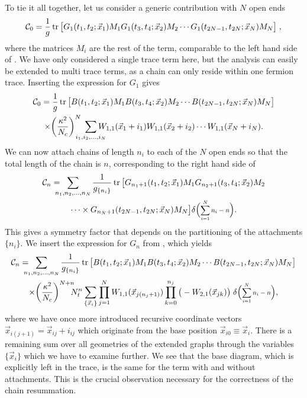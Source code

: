 To tie it all together, let us consider a generic contribution with $N$ open
ends
%
\begin{equation} \label{eq:chain_begin}
  \mathcal{C}_0 = \frac{1}{g} \operatorname{tr} \big[
    G_1(t_1,t_2;\vec{x}_1) M_1 G_1 (t_3,t_4;\vec{x}_2) M_2 \cdots
    G_1 (t_{2N-1},t_{2N};\vec{x}_N) M_N
  \big]\;,
\end{equation}
%
where the matrices $M_i$ are the rest of the term, comparable to the left hand
side of . We have only considered a single trace term
here, but the analysis can easily be extended to multi trace terms, as a
chain can only reside within one fermion trace. Inserting the expression for
$G_1$ gives
%
\begin{multline}
  \mathcal{C}_0 =
    \frac{1}{g} \tr \big[
    \bmat{}(t_1,t_2;\vec{x}_1) M_1 \bmat{}(t_3,t_4;\vec{x}_2) M_2
      \cdots \bmat{}(t_{2N-1},t_{2N};\vec{x}_N) M_N
    \big] \\
  \times \bigg(\frac{\kappa^2}{N_c}\bigg)^N\;\sum_{\mathclap{i_1,i_2,\dots,i_N}}
    W_{1,1}(\vec{x}_1 + i_1) W_{1,1}(\vec{x}_2 + i_2) 
    \cdots W_{1,1}(\vec{x}_N + i_N).
\end{multline}
%
We can now attach chains of length $n_i$ to each of the $N$ open ends so that
the total length of the chain is $n$, corresponding to the right hand side of
%
\begin{multline}
  \mathcal{C}_n =
    \hskip .2cm\sum_{\mathclap{n_1,n_2,\dots,n_N}} \hskip .5cm
      \frac{1}{g_{\{n_i\}}}
      \tr \big[
        G_{n_1 + 1}(t_1,t_2;\vec{x}_1) M_1
        G_{n_2+1} (t_3,t_4;\vec{x}_2) M_2 \\ 
        \cdots \times G_{n_N + 1} (t_{2N-1},t_{2N};\vec{x}_N) M_N
      \big]
    \delta\Big(\scalemath{0.8}{\sum_{i=1}^N n_i - n}\Big).
\end{multline}
%
This gives a symmetry factor that depends on the partitioning of the attachments
$\{n_i\}$.  We insert the expression for $G_n$ from , which
yields
%
\begin{multline}
  \mathcal{C}_n =
    \hskip .2cm\sum_{\mathclap{n_1,n_2,\dots,n_N}} \hskip .5cm
      \frac{1}{g_{\{n_i\}}}
      \tr \big[
      \bmat{}(t_1,t_2;\vec{x}_1) M_1 \bmat{}(t_3,t_4;\vec{x}_2) M_2 \cdots
      \bmat{}(t_{2N-1},t_{2N};\vec{x}_N) M_N
      \big]\\
  \times \bigg(\frac{\kappa^2}{N_c}\bigg)^{N+\mathrlap{n}}
    N_{t}^n \sum_{\{\vec{x}_i\}} \prod_{j=1}^N W_{1,1}(\vec{x}_{j (n_j+1)})
    \prod_{k=0}^{n_j} \big(-W_{2,1}(\vec{x}_{j k})\big) \;
    \delta\Big(\scalemath{0.8}{\sum_{i=1}^N n_i - n}\Big),
\end{multline}
%
where we have once more introduced recursive coordinate vectors
$\vec{x}_{i(j+1)} = \vec{x}_{ij} + i_{ij}$ which originate from the base
position $\vec{x}_{i0} \equiv \vec{x}_i$. There is a remaining sum over all
geometries of the extended graphs through the variables $\{\vec{x}_i\}$ which we
have to examine further.  We see that the base diagram, which is explicitly left
in the trace, is the same for the term with and without attachments. This is
the crucial observation necessary for the correctness of the chain resummation.


